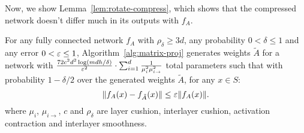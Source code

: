 Now, we show Lemma~\ref{lem:rotate-compress}, which shows that the compressed network doesn't differ much in its outputs with $f_A$.

\begin{lemma}\label{lem:rotate-compress}
    For any fully connected network $f_A$ with $\rho_\delta\geq 3d$, any probability $0 < \delta \leq 1$ and any error $0< \eps \leq 1$, Algorithm~\ref{alg:matrix-proj} generates weights $\tilde{A}$ for a network with $\frac{72c^2d^2\log (mdh/\delta)}{\eps^2}\cdot \sum_{i=1}^d \frac{1}{\mu_i^2\mu_{i\rightarrow}^2}$ total parameters such that with probability $1-\delta/2$ over the generated weights $\tilde{A}$, for any $x\in S$:
    $$
    \|f_A(x) - f_{\tilde{A}}(x)\| \le \eps\|f_A(x)\|.
    $$
    where $\mu_i$, $\mu_{i\rightarrow}$, $c$ and $\rho_{\delta}$ are layer cushion, interlayer cushion, activation contraction and interlayer smoothness.
\end{lemma}

